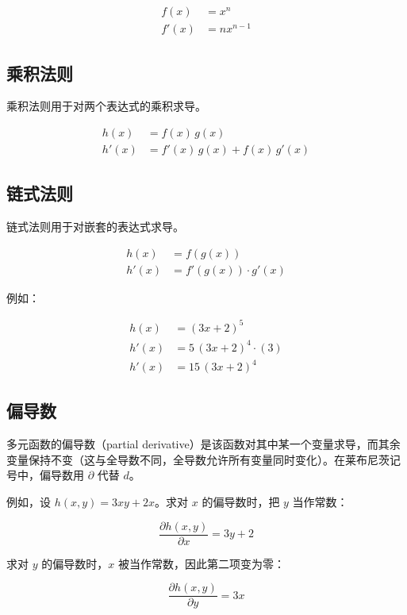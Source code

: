 \begin{align*}
  f(x) &= x^n \\
  f'(x) &= n x^{n-1}
\end{align*}

\subsection{乘积法则}
\label{sec:productrule}

乘积法则用于对两个表达式的乘积求导。

\begin{align*}
  h(x) &= f(x) \, g(x) \\
  h'(x) &= f'(x) \, g(x) + f(x) \, g'(x)
\end{align*}

\subsection{链式法则}
\label{sec:chainrule}

链式法则用于对嵌套的表达式求导。

\begin{align*}
  h(x) &= f(g(x)) \\
  h'(x) &= f'(g(x)) \cdot g'(x)
\end{align*}

例如：

\begin{align*}
  h(x) &= (3x + 2)^5 \\
  h'(x) &= 5 \, (3x + 2)^4 \cdot (3) \\
  h'(x) &= 15 \, (3x + 2)^4
\end{align*}

\subsection{偏导数}
\label{sec:partialderivatives}

多元函数的偏导数（partial derivative）是该函数对其中某一个变量求导，而其余变量保持不变（这与全导数不同，全导数允许所有变量同时变化）。在莱布尼茨记号中，偏导数用 $\partial$ 代替 $d$。

例如，设 $h(x, y) = 3xy + 2x$。求对 $x$ 的偏导数时，把 $y$ 当作常数：

\[
  \frac{\partial h(x,y)}{\partial x} = 3y + 2
\]

求对 $y$ 的偏导数时，$x$ 被当作常数，因此第二项变为零：

\[
  \frac{\partial h(x,y)}{\partial y} = 3x
\]

